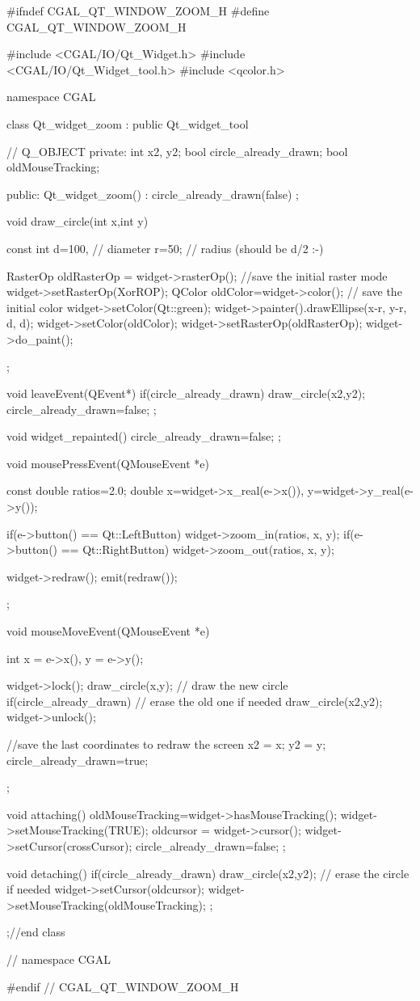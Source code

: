 \begin{ccExampleCode}
#ifndef CGAL_QT_WINDOW_ZOOM_H
#define CGAL_QT_WINDOW_ZOOM_H

#include <CGAL/IO/Qt_Widget.h>
#include <CGAL/IO/Qt_Widget_tool.h>
#include <qcolor.h>

namespace CGAL {

class Qt_widget_zoom : public Qt_widget_tool
{
  //  Q_OBJECT
private:
	int									    x2, y2;
	bool circle_already_drawn;
	bool oldMouseTracking;

public:
  Qt_widget_zoom() : circle_already_drawn(false) {};

	void draw_circle(int x,int y)
	{
		const int
			d=100, // diameter
			r=50;  // radius (should be d/2 :-)

		RasterOp oldRasterOp = widget->rasterOp();	//save the initial raster mode
		widget->setRasterOp(XorROP);
		QColor oldColor=widget->color(); // save the initial color
		widget->setColor(Qt::green);
		widget->painter().drawEllipse(x-r, y-r, d, d);
		widget->setColor(oldColor);
		widget->setRasterOp(oldRasterOp);
		widget->do_paint();
	};

	void leaveEvent(QEvent*)
	{
		if(circle_already_drawn)
			draw_circle(x2,y2);
		circle_already_drawn=false;
	};

	void widget_repainted(){
		circle_already_drawn=false;
	};

  void mousePressEvent(QMouseEvent *e)
  {
		const double ratios=2.0;
		double
			x=widget->x_real(e->x()),
			y=widget->y_real(e->y());
		
    if(e->button() == Qt::LeftButton)
			widget->zoom_in(ratios, x, y);
    if(e->button() == Qt::RightButton)
			widget->zoom_out(ratios, x, y);
		
		widget->redraw();
		emit(redraw()); 
	};

  void mouseMoveEvent(QMouseEvent *e)
  {
		int
			x = e->x(),
			y = e->y();

		widget->lock();
		draw_circle(x,y); // draw the new circle
		if(circle_already_drawn) // erase the old one if needed
			draw_circle(x2,y2);
		widget->unlock();
		
		//save the last coordinates to redraw the screen
		x2 = x;
		y2 = y;
		circle_already_drawn=true;
	};

	void attaching()
	{
		oldMouseTracking=widget->hasMouseTracking();
		widget->setMouseTracking(TRUE);
		oldcursor = widget->cursor();
		widget->setCursor(crossCursor);
		circle_already_drawn=false;
	};

	void detaching()
	{
		if(circle_already_drawn)
			draw_circle(x2,y2); // erase the circle if needed
		widget->setCursor(oldcursor);
		widget->setMouseTracking(oldMouseTracking);
	};
};//end class 

} // namespace CGAL

#endif // CGAL_QT_WINDOW_ZOOM_H
\end{ccExampleCode}








